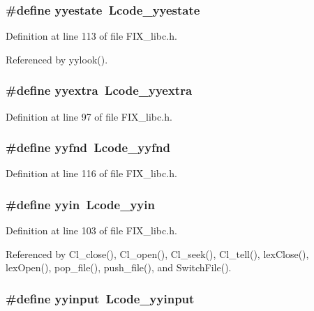 \subsubsection{\setlength{\rightskip}{0pt plus 5cm}\#define \bf{yyestate}~Lcode\_\-yyestate}\label{FIX__libc_8h_e89efef7288c76e7485f82600873078f}




Definition at line 113 of file FIX\_\-libc.h.

Referenced by yylook().
\subsubsection{\setlength{\rightskip}{0pt plus 5cm}\#define \bf{yyextra}~Lcode\_\-yyextra}\label{FIX__libc_8h_6d98927535a334881d37873915fbc45f}




Definition at line 97 of file FIX\_\-libc.h.
\subsubsection{\setlength{\rightskip}{0pt plus 5cm}\#define \bf{yyfnd}~Lcode\_\-yyfnd}\label{FIX__libc_8h_b0445c91d9f097f6ae69d625ea5fb4eb}




Definition at line 116 of file FIX\_\-libc.h.
\subsubsection{\setlength{\rightskip}{0pt plus 5cm}\#define \bf{yyin}~Lcode\_\-yyin}\label{FIX__libc_8h_a789f4617e33fb99594cb04a3688a0c1}




Definition at line 103 of file FIX\_\-libc.h.

Referenced by Cl\_\-close(), Cl\_\-open(), Cl\_\-seek(), Cl\_\-tell(), lex\-Close(), lex\-Open(), pop\_\-file(), push\_\-file(), and Switch\-File().
\subsubsection{\setlength{\rightskip}{0pt plus 5cm}\#define yyinput~Lcode\_\-yyinput}\label{FIX__libc_8h_346b83839385380c9d9134ed1cf137bc}




